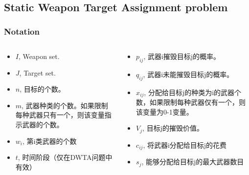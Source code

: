 \documentclass[CJK,10pt]{beamer}
\begin{document}
\subsection{Static Weapon Target Assignment problem}


\begin{frame}
    \frametitle{Notation}
    \begin{columns}
        \begin{column}{.50\linewidth}
            \footnotesize
            \begin{itemize}
                \item $I$, Weapon set.
                \item $J$, Target set.
                \item $n$, 目标的个数。
                \item $m$, 武器种类的个数。如果限制每种武器只有一个，则该变量指示武器的个数。
                \item $w_i$, 第i类武器的个数
                \item $t$, 时间阶段（仅在DWTA问题中有效）
            \end{itemize}
        \end{column}
        \begin{column}{.50\linewidth}
            \footnotesize
            \begin{itemize}
                \item $p_{ij}$, 武器i摧毁目标j的概率。
                \item $q_{ij}$, 武器i未能摧毁目标j的概率。
                \item $x_{ij}$, 分配给目标j的种类为i的武器个数，如果限制每种武器仅有一个，则该变量为0-1变量。
                \item $V_j$, 目标j的摧毁价值。
                \item $c_{ij}$, 将武器i分配给目标j的花费
                \item $s_j$, 能够分配给目标j的最大武器数目
            \end{itemize}
        \end{column}
    \end{columns}
\end{frame}
\end{document}

